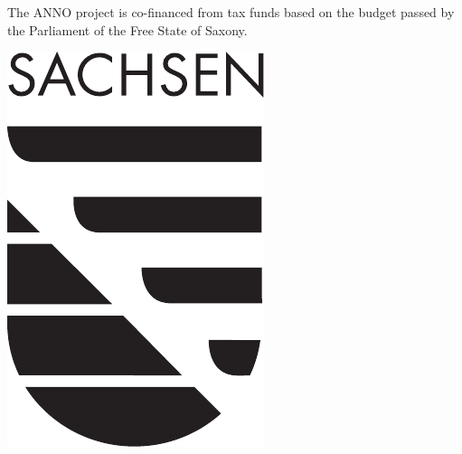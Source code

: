 \documentclass[sw]{iosart2x}
\begin{document}
\begin{ack}
\noindent\begin{minipage}{0.90\textwidth}
The ANNO project is co-financed from tax funds based on the budget passed by the Parliament of the Free State of Saxony.
\end{minipage}%
\hfill%
\begin{minipage}{0.04\textwidth}\raggedleft
\includegraphics[width=\textwidth]{img/saxony.pdf}
\end{minipage}
\end{ack}

\nocite{*}


\end{document}
